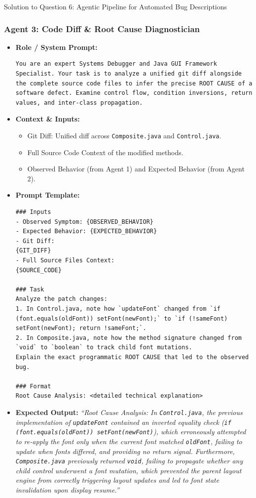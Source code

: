 \documentclass[11pt,a4paper]{article}
\begin{document}
\begin{solutionbox}{Solution to Question 6: Agentic Pipeline for Automated Bug Descriptions}
\newpage

\subsubsection*{Agent 3: Code Diff \& Root Cause Diagnostician}
\begin{itemize}[leftmargin=1.5em]
    \item \textbf{Role / System Prompt:}
\begin{lstlisting}[style=diffstyle]
You are an expert Systems Debugger and Java GUI Framework Specialist. Your task is to analyze a unified git diff alongside the complete source code files to infer the precise ROOT CAUSE of a software defect. Examine control flow, condition inversions, return values, and inter-class propagation.
\end{lstlisting}
    \item \textbf{Context \& Inputs:}
    \begin{itemize}
        \item Git Diff: Unified diff across \texttt{Composite.java} and \texttt{Control.java}.
        \item Full Source Code Context of the modified methods.
        \item Observed Behavior (from Agent 1) and Expected Behavior (from Agent 2).
    \end{itemize}
    \item \textbf{Prompt Template:}
\begin{lstlisting}[style=diffstyle]
### Inputs
- Observed Symptom: {OBSERVED_BEHAVIOR}
- Expected Behavior: {EXPECTED_BEHAVIOR}
- Git Diff:
{GIT_DIFF}
- Full Source Files Context:
{SOURCE_CODE}

### Task
Analyze the patch changes:
1. In Control.java, note how `updateFont` changed from `if (font.equals(oldFont)) setFont(newFont);` to `if (!sameFont) setFont(newFont); return !sameFont;`.
2. In Composite.java, note how the method signature changed from `void` to `boolean` to track child font mutations.
Explain the exact programmatic ROOT CAUSE that led to the observed bug.

### Format
Root Cause Analysis: <detailed technical explanation>
\end{lstlisting}
    \item \textbf{Expected Output:}
    \textit{“Root Cause Analysis: In \texttt{Control.java}, the previous implementation of \texttt{updateFont} contained an inverted equality check (\texttt{if (font.equals(oldFont)) setFont(newFont)}), which erroneously attempted to re-apply the font only when the current font matched \texttt{oldFont}, failing to update when fonts differed, and providing no return signal. Furthermore, \texttt{Composite.java} previously returned \texttt{void}, failing to propagate whether any child control underwent a font mutation, which prevented the parent layout engine from correctly triggering layout updates and led to font state invalidation upon display resume.”}
\end{itemize}


\end{solutionbox}
\end{document}
